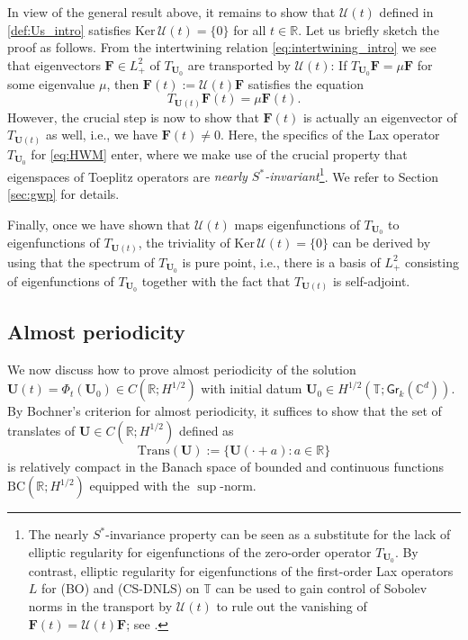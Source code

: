 \documentclass[10pt,reqno,a4paper]{amsart}
\theoremstyle{definition}
\theoremstyle{remark}
\theoremstyle{remark}
\numberwithin{equation}{section}
\newcommand{\BC}{\mathrm{BC}}
\newcommand{\C}{\mathbb{C}}
\newcommand{\R}{\mathbb{R}}
\newcommand{\T}{\mathbb{T}}
\renewcommand{\ker}{\mathrm{Ker}}
\newcommand{\Ub}{\mathbf{U}}
\newcommand{\Fb}{\mathbf{F}}
\newcommand{\Gr}{\mathsf{Gr}}
\newcommand{\Us}{\mathscr{U}}
\begin{document}
In view of the general result above, it remains to show that $\Us(t)$ defined in \eqref{def:Us_intro} satisfies $\ker \, \Us(t) = \{ 0 \}$ for all $t \in \R$. Let us briefly sketch the proof as follows. From the intertwining relation \eqref{eq:intertwining_intro} we see that eigenvectors $\Fb \in L^2_+$ of $T_{\Ub_0}$ are transported by $\Us(t)$: If $T_{\Ub_0} \Fb = \mu \Fb$ for some eigenvalue $\mu$, then $\Fb(t) := \Us(t) \Fb$ satisfies the equation
$$
T_{\Ub(t)} \Fb(t) = \mu \Fb(t).
$$
However, the crucial step is now to show that $\Fb(t)$ is actually an eigenvector of $T_{\Ub(t)}$ as well, i.e., we have $\Fb(t) \neq 0$. Here, the specifics of the Lax operator $T_{\Ub_0}$ for \eqref{eq:HWM} enter, where we make use of the crucial property that eigenspaces of Toeplitz operators are {\em nearly $S^*$-invariant}\footnote{The nearly $S^*$-invariance property can be seen as a substitute for the lack of elliptic regularity for eigenfunctions of the zero-order operator $T_{\Ub_0}$. By contrast, elliptic regularity for eigenfunctions of the first-order Lax operators $L$ for (BO) and (CS-DNLS) on $\T$ can be used to gain control of Sobolev norms in the transport by $\Us(t)$ to rule out the vanishing of $\Fb(t)=\Us(t) \Fb$; see \cite{Ba-24}.}. We refer to Section \ref{sec:gwp} for details. 

Finally, once we have shown that $\Us(t)$ maps eigenfunctions of $T_{\Ub_0}$ to eigenfunctions of $T_{\Ub(t)}$, the triviality of $\ker \, \Us(t) = \{ 0 \}$ can be derived by using that the spectrum of $T_{\Ub_0}$ is pure point, i.e., there is a basis of $L^2_+$ consisting of eigenfunctions of $T_{\Ub_0}$ together with the fact that $T_{\Ub(t)}$ is self-adjoint.

\subsection{Almost periodicity} We now discuss how to prove almost periodicity of the solution $\Ub(t) = \Phi_t(\Ub_0) \in C(\R; H^{1/2})$ with initial datum $\Ub_0 \in H^{1/2}(\T; \Gr_k(\C^d))$. By Bochner's criterion for almost periodicity, it suffices to show that the set of translates of $\Ub \in C(\R;H^{1/2})$ defined as
$$
\mathrm{Trans}(\Ub) := \{ \Ub(\cdot + a) : a \in \R \}
$$
is relatively compact in the Banach space of bounded and continuous functions $\BC(\R; H^{1/2})$ equipped with the $\sup$-norm.
\end{document}
